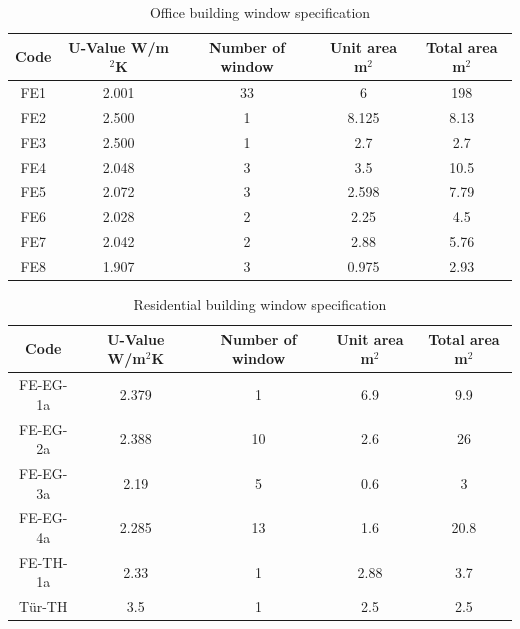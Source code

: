 \documentclass[a4paper, oneside]{discothesis}
\begin{document}
			
				\begin{table}[H]
				\centering
				\caption{Office building window specification}
			    \begin{tabular}{ccccc}
			    	\toprule
				    \multicolumn{1}{p{3em}}{Code} & \multicolumn{1}{p{3.785em}}{U-Value W/m$^2$K} & \multicolumn{1}{c}{Number of window} & \multicolumn{1}{p{4.215em}}{Unit area \newline{} m$^2$} & \multicolumn{1}{p{5em}}{Total area \newline{} m$^2$} \\
				    \midrule
				    \multicolumn{1}{c}{FE1} & 2.001 & 33   & 6    & 198 \\
				    \midrule
				    \multicolumn{1}{c}{FE2} & 2.500 & 1    & 8.125 & 8.13 \\
				    \midrule
				    \multicolumn{1}{c}{FE3} & 2.500 & 1    & 2.7  & 2.7 \\
				    \midrule
				    FE4  & 2.048 & 3    & 3.5  & 10.5 \\
				    \midrule
				    FE5  & 2.072 & 3    & 2.598 & 7.79 \\
				    \midrule
				    FE6  & 2.028 & 2    & 2.25 & 4.5 \\
				    \midrule
				    FE7  & 2.042 & 2    & 2.88 & 5.76 \\
				    \midrule
				    FE8  & 1.907 & 3    & 0.975 & 2.93 \\
				    \bottomrule
			    \end{tabular}%
				\label{tab:SumatraWindow}%
				\end{table}%

				\begin{table}[H]
				\centering
				\caption{Residential building window specification}
				    \begin{tabular}{ccccc}
				    \toprule
				     \multicolumn{1}{p{3em}}{Code} & \multicolumn{1}{p{3.785em}}{U-Value W/m$^2$K} & \multicolumn{1}{c}{Number of window} & \multicolumn{1}{p{4.215em}}{Unit area \newline{} m$^2$} & \multicolumn{1}{p{5em}}{Total area \newline{} m$^2$} \\
				    \midrule
				    FE-EG-1a & 2.379 & 1    & 6.9  & 9.9 \\
				    \midrule
				    FE-EG-2a & 2.388 & 10   & 2.6  & 26 \\
				    \midrule
				    FE-EG-3a & 2.19 & 5    & 0.6  & 3 \\
				    \midrule
				    FE-EG-4a & 2.285 & 13   & 1.6  & 20.8 \\
				    \midrule
				    FE-TH-1a & 2.33 & 1    & 2.88 & 3.7 \\
				    \midrule
				    Tür-TH & 3.5  & 1    & 2.5  & 2.5 \\
				    \bottomrule
				    \end{tabular}%
				\label{tab:HonggWindow}%
				\end{table}%
		
\end{document}
